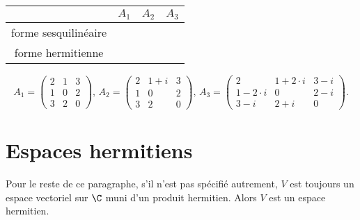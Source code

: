 \begin{enumerate}
\bigskip 

  \begin{center}
 
    \begin{tabular}{|c|c|c|c|}
      \hline 
      & $A_1$ & $A_2$ & $A_3$ \\\hline 
      forme sesquilinéaire & & & \\ \hline 
      forme hermitienne & & & \\ \hline 
    \end{tabular}
  \end{center}
  
  \medskip 


  \begin{displaymath}
    A_1 = 
    \begin{pmatrix}
      2 & 1 & 3 \\
      1 & 0 & 2 \\
      3 & 2 & 0
    \end{pmatrix}, \, 
    A_2 = 
 \begin{pmatrix}
      2 & 1+i & 3 \\
      1 & 0 & 2 \\
      3 & 2 & 0
    \end{pmatrix}, \, 
     A_3 = 
    \begin{pmatrix}
      2 & 1+ 2 \cdot i & 3 - i \\
      1 - 2 \cdot i & 0 & 2-i \\
      3-i & 2+i & 0
    \end{pmatrix}. 
  \end{displaymath}


  

\end{enumerate}





\section{Espaces hermitiens} 
\label{sec:espaces-hermitiens}



\begin{framed}\noindent 
  Pour le reste de ce paragraphe, s'il n'est pas spécifié autrement,  $V$
  est toujours un espace vectoriel sur $\C$
  muni d'un produit hermitien. Alors $V$ est un espace hermitien. 
\end{framed}




